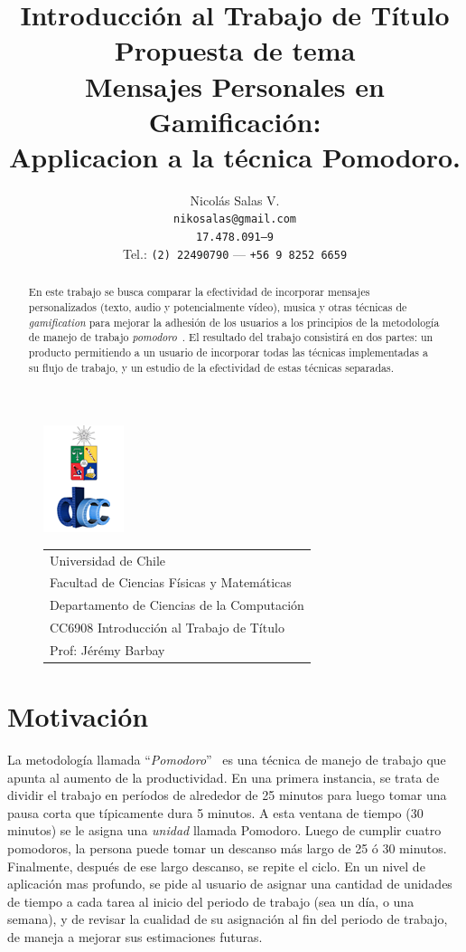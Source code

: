 \documentclass[12pt,letterpaper]{report}
\title{{\small Introducción al Trabajo de Título \\  Propuesta de tema}
\\
{\Huge 
Mensajes Personales en Gamificación:\\
Applicacion a la técnica  Pomodoro.} 
}
\author{Nicolás Salas V.\\\texttt{nikosalas@gmail.com}\\\texttt{17.478.091--9}\\Tel.: \texttt{(2) 22490790} --- \texttt{+56 9 8252 6659}}
\begin{document}
\begin{figure}[t]
\includegraphics[scale=0.83]{logo.png}
\begin{tabular}{l}
\small Universidad de Chile\\
\small Facultad de Ciencias Físicas y Matemáticas\\
\small Departamento de Ciencias de la Computación\\
\small CC6908 Introducción al Trabajo de Título\\
\small Prof: Jérémy Barbay
\vspace{2.3cm}
\end{tabular}
\end{figure}
\maketitle

\begin{abstract}
    En este trabajo se busca comparar la efectividad de incorporar mensajes
    personalizados (texto, audio y potencialmente vídeo), musica y otras
    técnicas de \emph{gamification} para mejorar la adhesión de los usuarios a
    los principios de la metodología de manejo de trabajo
    \emph{pomodoro}~\cite{cirillo2009pomodoro}. El resultado del trabajo
    consistirá en dos partes: un producto permitiendo a un usuario de
    incorporar todas las técnicas implementadas a su flujo de trabajo, y  un
    estudio de la efectividad de estas técnicas separadas.
\end{abstract}

\tableofcontents
\newpage

\hypertarget{motivaciuxf3n}{%
\section{Motivación}\label{motivaciuxf3n}}

La metodología llamada ``\emph{Pomodoro}''~\cite{cirillo2009pomodoro} es una
técnica de manejo de trabajo que apunta al aumento de la productividad. En una
primera instancia, se trata de dividir el trabajo en períodos de alrededor de
25 minutos para luego tomar una pausa corta que típicamente dura 5 minutos. A
esta ventana de tiempo (30 minutos) se le asigna una \emph{unidad} llamada
Pomodoro.  Luego de cumplir cuatro pomodoros, la persona puede tomar un
descanso más largo de 25 ó 30 minutos. Finalmente, después de ese largo
descanso, se repite el ciclo. En un nivel de aplicación mas profundo, se pide
al usuario de asignar una cantidad de unidades de tiempo a cada tarea al inicio
del periodo de trabajo (sea un día, o una semana), y de revisar la cualidad de
su asignación al fin del periodo de trabajo, de maneja a mejorar sus
estimaciones futuras.
\end{document}
